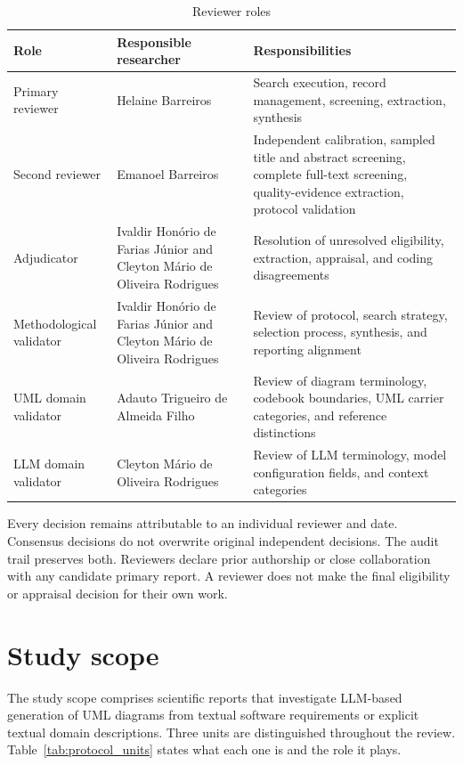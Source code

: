 \begin{table}[htbp]
\centering
\small
\caption{Reviewer roles}
\label{tab:protocol_reviewers}
\begin{tabularx}{\textwidth}{p{} p{} X}
\toprule
\textbf{Role} & \textbf{Responsible researcher} & \textbf{Responsibilities} \\
\midrule
Primary reviewer & Helaine Barreiros & Search execution, record management, screening, extraction, synthesis \\
Second reviewer & Emanoel Barreiros & Independent calibration, sampled title and abstract screening, complete full-text screening, quality-evidence extraction, protocol validation \\
Adjudicator & Ivaldir Hon\'orio de Farias J\'unior and Cleyton M\'ario de Oliveira Rodrigues & Resolution of unresolved eligibility, extraction, appraisal, and coding disagreements \\
Methodological validator & Ivaldir Hon\'orio de Farias J\'unior and Cleyton M\'ario de Oliveira Rodrigues & Review of protocol, search strategy, selection process, synthesis, and reporting alignment \\
UML domain validator & Adauto Trigueiro de Almeida Filho & Review of diagram terminology, codebook boundaries, UML carrier categories, and reference distinctions \\
LLM domain validator & Cleyton M\'ario de Oliveira Rodrigues & Review of LLM terminology, model configuration fields, and context categories \\
\bottomrule
\end{tabularx}
\end{table}


Every decision remains attributable to an individual reviewer and date. Consensus decisions do not overwrite original independent decisions. The audit trail preserves both. Reviewers declare prior authorship or close collaboration with any candidate primary report. A reviewer does not make the final eligibility or appraisal decision for their own work.

\section{Study scope}
\label{sec:protocol_scope}

The study scope comprises scientific reports that investigate LLM-based generation of UML diagrams from textual software requirements or explicit textual domain descriptions. Three units are distinguished throughout the review. Table~\ref{tab:protocol_units} states what each one is and the role it plays.

